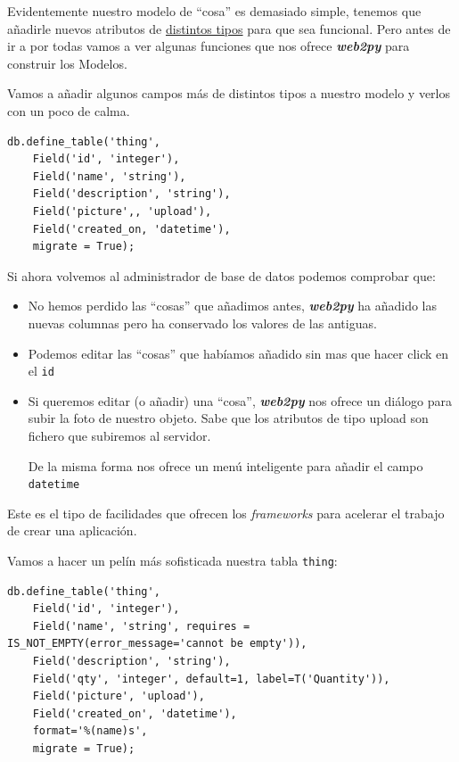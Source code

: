 \documentclass[
  12pt,
  spanish,
]{article}
\begin{document}
Evidentemente nuestro modelo de ``cosa'' es demasiado simple, tenemos
que añadirle nuevos atributos de
\href{http://web2py.com/books/default/chapter/29/06/the-database-abstraction-layer\#Field-types}{distintos
tipos} para que sea funcional. Pero antes de ir a por todas vamos a ver
algunas funciones que nos ofrece \textbf{\emph{web2py}} para construir
los Modelos.

Vamos a añadir algunos campos más de distintos tipos a nuestro modelo y
verlos con un poco de calma.

\begin{verbatim}
db.define_table('thing',
    Field('id', 'integer'),
    Field('name', 'string'),
    Field('description', 'string'),
    Field('picture',, 'upload'),
    Field('created_on, 'datetime'),
    migrate = True);
\end{verbatim}

Si ahora volvemos al administrador de base de datos podemos comprobar
que:

\begin{itemize}
\item
  No hemos perdido las ``cosas'' que añadimos antes,
  \textbf{\emph{web2py}} ha añadido las nuevas columnas pero ha
  conservado los valores de las antiguas.
\item
  Podemos editar las ``cosas'' que habíamos añadido sin mas que hacer
  click en el \texttt{id}
\item
  Si queremos editar (o añadir) una ``cosa'', \textbf{\emph{web2py}} nos
  ofrece un diálogo para subir la foto de nuestro objeto. Sabe que los
  atributos de tipo upload son fichero que subiremos al servidor.

  De la misma forma nos ofrece un menú inteligente para añadir el campo
  \texttt{datetime}
\end{itemize}

Este es el tipo de facilidades que ofrecen los \emph{frameworks} para
acelerar el trabajo de crear una aplicación.

Vamos a hacer un pelín más sofisticada nuestra tabla \texttt{thing}:

\begin{verbatim}
db.define_table('thing',
    Field('id', 'integer'),
    Field('name', 'string', requires = IS_NOT_EMPTY(error_message='cannot be empty')),
    Field('description', 'string'),
    Field('qty', 'integer', default=1, label=T('Quantity')),
    Field('picture', 'upload'),
    Field('created_on', 'datetime'),
    format='%(name)s',
    migrate = True);
\end{verbatim}
\end{document}
